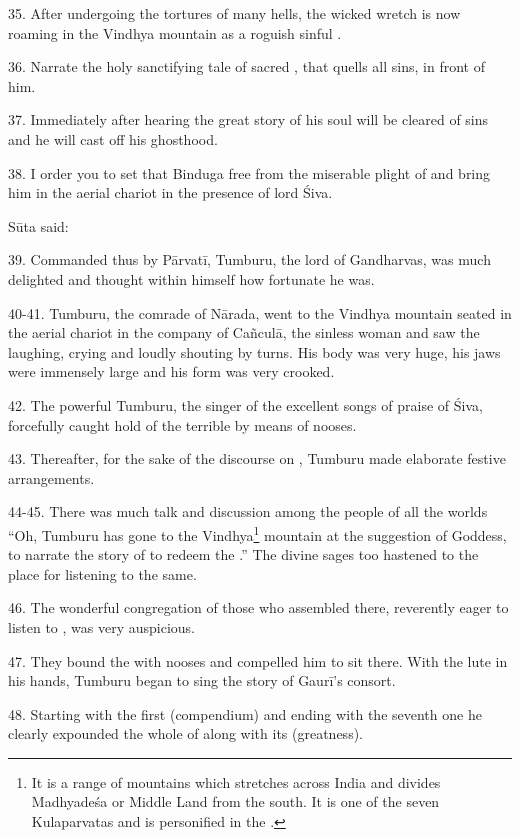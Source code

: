 35. After undergoing the tortures of many hells, the wicked wretch is now
roaming in the Vindhya mountain as a roguish sinful .

36. Narrate the holy sanctifying tale of sacred , that quells all
sins, in front of him.

37. Immediately after hearing the great story of  his soul will
be cleared of sins and he will cast off his ghosthood.

38. I order you to set that Binduga free from the miserable plight of
 and bring him in the aerial chariot in the presence of lord Śiva.

Sūta said:

39. Commanded thus by Pārvatī, Tumburu, the lord of Gandharvas, was much
delighted and thought within himself how fortunate he was.

40-41. Tumburu, the comrade of Nārada, went to the Vindhya mountain seated in
the aerial chariot in the company of Cañculā, the sinless woman and saw the
 laughing, crying and loudly shouting by turns. His body was very
huge, his jaws were immensely large and his form was very crooked.

42. The powerful Tumburu, the singer of the excellent songs of praise of Śiva,
forcefully caught hold of the terrible  by means of nooses.

43. Thereafter, for the sake of the discourse on , Tumburu made
elaborate festive arrangements.

44-45. There was much talk and discussion among the people of all the worlds
“Oh, Tumburu has gone to the Vindhya\footnote{It is a range of mountains which
stretches across India and divides Madhyadeśa or Middle Land from the south. It
is one of the seven Kulaparvatas and is personified in the .}
mountain at the suggestion of Goddess, to narrate the story of 
to redeem the .” The divine sages too hastened to the place for
listening to the same.

46. The wonderful congregation of those who assembled there, reverently eager to
listen to , was very auspicious.

47. They bound the  with nooses and compelled him to sit there. With
the lute in his hands, Tumburu began to sing the story of Gaurī’s consort.

48. Starting with the first  (compendium) and ending with the
seventh one he clearly expounded the whole of  along with its
 (greatness).

